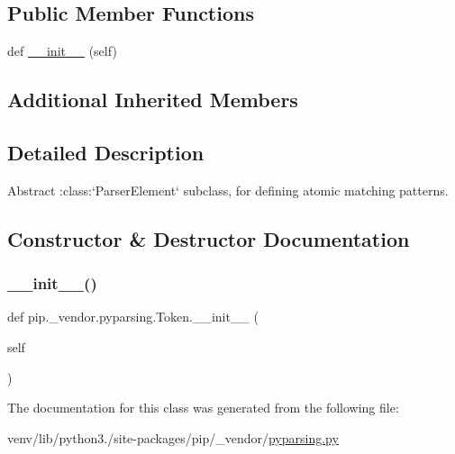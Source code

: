\subsection*{Public Member Functions}
\begin{DoxyCompactItemize}
\item 
def \hyperlink{classpip_1_1__vendor_1_1pyparsing_1_1Token_ab076acf85fe166a0093d25b7fea8bf66}{\+\_\+\+\_\+init\+\_\+\+\_\+} (self)
\end{DoxyCompactItemize}
\subsection*{Additional Inherited Members}


\subsection{Detailed Description}
\begin{DoxyVerb}Abstract :class:`ParserElement` subclass, for defining atomic
matching patterns.
\end{DoxyVerb}
 

\subsection{Constructor \& Destructor Documentation}
\mbox{\label{classpip_1_1__vendor_1_1pyparsing_1_1Token_ab076acf85fe166a0093d25b7fea8bf66}} 
\subsubsection{\texorpdfstring{\+\_\+\+\_\+init\+\_\+\+\_\+()}{\_\_init\_\_()}}
{\footnotesize\ttfamily def pip.\+\_\+vendor.\+pyparsing.\+Token.\+\_\+\+\_\+init\+\_\+\+\_\+ (\begin{DoxyParamCaption}\item[{}]{self }\end{DoxyParamCaption})}



The documentation for this class was generated from the following file\+:\begin{DoxyCompactItemize}
\item 
venv/lib/python3./site-\/packages/pip/\+\_\+vendor/\hyperlink{pip_2__vendor_2pyparsing_8py}{pyparsing.\+py}\end{DoxyCompactItemize}
